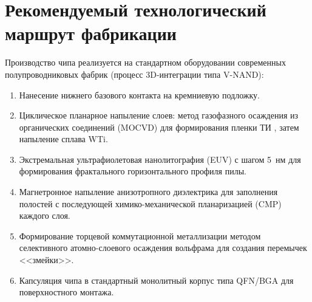 \documentclass[11pt,a4paper]{article}
\begin{document}
\section{Рекомендуемый технологический маршрут фабрикации}

Производство чипа реализуется на стандартном оборудовании современных
полупроводниковых фабрик (процесс 3D-интеграции типа V-NAND):
\begin{enumerate}
  \item Нанесение нижнего базового контакта на кремниевую подложку.
  \item Циклическое планарное напыление слоев: метод газофазного осаждения из
        органических соединений (MOCVD) для формирования пленки ТИ ,
        затем напыление сплава WTi.
  \item Экстремальная ультрафиолетовая нанолитография (EUV) с шагом 5~нм для
        формирования фрактального горизонтального профиля пилы.
  \item Магнетронное напыление анизотропного диэлектрика  для
        заполнения полостей с последующей химико-механической планаризацией
        (CMP) каждого слоя.
  \item Формирование торцевой коммутационной металлизации методом селективного
        атомно-слоевого осаждения вольфрама для создания перемычек <<змейки>>.
  \item Капсуляция чипа в стандартный монолитный корпус типа QFN/BGA для
        поверхностного монтажа.
\end{enumerate}
\end{document}
